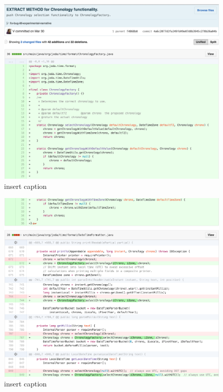 \begin{figure}[H]
	\centering
	\includegraphics[width=\linewidth]{code42}
	\caption{insert caption}
\end{figure}
\begin{figure}[H]
	\centering
	\includegraphics[width=\linewidth]{code43}
	\caption{insert caption}
\end{figure}
